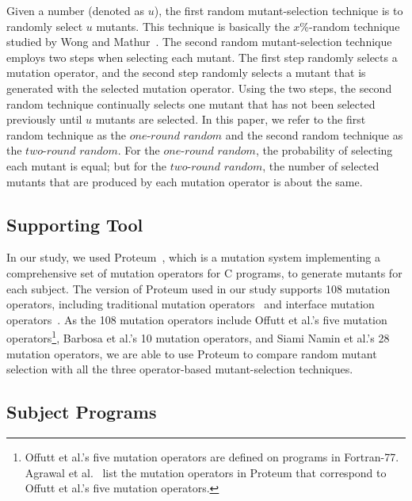 Given a number (denoted as $u$), the first random mutant-selection
technique is to randomly select $u$ mutants. This technique is
basically the $x$\%-random technique studied by Wong and
Mathur~\cite{Wong:93,Wong:95}. The second random mutant-selection
technique employs two steps when selecting each mutant. The first
step randomly selects a mutation operator, and the second step
randomly selects a mutant that is generated with the selected
mutation operator. Using the two steps, the second random
technique continually selects one mutant that has not been
selected previously until $u$ mutants are selected. In this paper,
we refer to the first random technique as the $one$-$round$
$random$ and the second random technique as the $two$-$round$
$random$. For the $one$-$round$ $random$, the probability of
selecting each mutant is equal; but for the $two$-$round$
$random$, the number of selected mutants that are produced by each
mutation operator is about the same.

\vspace{-1ex}
\subsection{Supporting Tool}
\label{Tool}

In our study, we used Proteum~\cite{Delamaro:96}, which is a
mutation system implementing a comprehensive set of mutation
operators for C programs, to generate mutants for each subject.
The version of Proteum used in our study supports 108 mutation
operators, including traditional mutation
operators~\cite{Agrawal:06} and interface mutation
operators~\cite{Delamaro:01}. As the 108 mutation operators
include Offutt et al.'s five mutation operators\footnote{Offutt et
al.'s five mutation operators are defined on programs in
Fortran-77. Agrawal et al.~\cite{Agrawal:06} list the mutation
operators in Proteum that correspond to Offutt et al.'s five
mutation operators.}, Barbosa et al.'s 10 mutation operators, and
Siami Namin et al.'s 28 mutation operators, we are able to use
Proteum to compare random mutant selection with all the three
operator-based mutant-selection techniques.

\vspace{-1ex}
\subsection{Subject Programs}
\label{Subjects}

